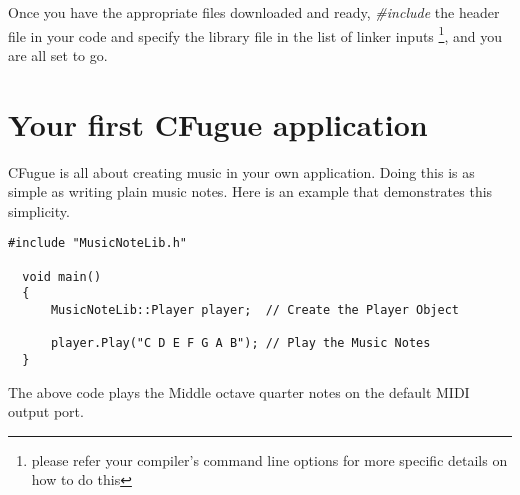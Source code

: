 Once you have the appropriate files downloaded and ready, \emph{\#include} the header file in your code and specify the library file in the list of linker inputs \footnote{please refer your compiler's command line options for more specific details on how to do this}, and you are all set to go.

\section{Your first CFugue application}
CFugue is all about creating music in your own application. Doing this is as simple as writing plain music notes. Here is an example that demonstrates this simplicity.
\begin{lstlisting}[frame=shadowbox,caption={Code to play middle octave},label=FirstApp]
  #include "MusicNoteLib.h"    
  
  void main()
  {      
      MusicNoteLib::Player player;  // Create the Player Object      
      
      player.Play("C D E F G A B"); // Play the Music Notes
  }
\end{lstlisting}
The above code plays the Middle octave quarter notes on the default MIDI output port.